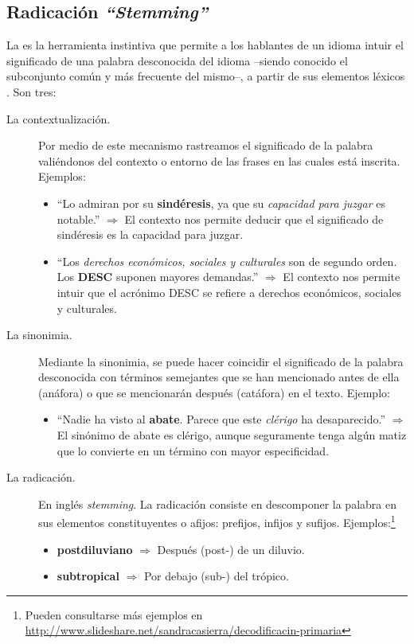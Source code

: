 \subsection{Radicación \emph{``Stemming''}}

La  es la herramienta instintiva que permite a los hablantes de un idioma intuir el significado de una palabra desconocida del idioma --siendo conocido el subconjunto común y más frecuente del mismo--, a partir de sus elementos léxicos \citep{Zubira2002}. Son tres:
\nopagebreak
\begin{description}
\item[La contextualización.] Por medio de este mecanismo rastreamos el significado de la palabra valiéndonos del contexto o entorno de las frases en las cuales está inscrita. Ejemplos:
\nopagebreak
\begin{itemize}
\item ``Lo admiran por su \textbf{sindéresis}, ya que su \emph{capacidad para juzgar} es notable.'' $\Longrightarrow$ El contexto nos permite deducir que el significado de sindéresis es la capacidad para juzgar.
\item ``Los \emph{derechos económicos, sociales y culturales} son de segundo orden. Los \textbf{DESC} suponen mayores demandas.'' $\Longrightarrow$ El contexto nos permite intuir que el acrónimo DESC se refiere a derechos económicos, sociales y culturales.
\end{itemize}
%
\item[La sinonimia.] Mediante la sinonimia, se puede hacer coincidir el significado de la palabra desconocida con términos semejantes que se han mencionado antes de ella (anáfora) o que se mencionarán después (catáfora) en el texto. Ejemplo:
\nopagebreak
\begin{itemize}
\item ``Nadie ha visto al \textbf{abate}. Parece que este \emph{clérigo} ha desaparecido.'' $\Longrightarrow$ El sinónimo de abate es clérigo, aunque seguramente tenga algún matiz que lo convierte en un término con mayor especificidad.
\end{itemize}
%
\item[La radicación.] En inglés \emph{stemming}. La radicación consiste en descomponer la palabra en sus elementos constituyentes o afijos: prefijos, infijos y sufijos. Ejemplos:\footnote{Pueden consultarse más ejemplos en \url{http://www.slideshare.net/sandracasierra/decodificacin-primaria}}
\nopagebreak
\begin{itemize}
\item \textbf{postdiluviano} $\Longrightarrow$ Después (post-) de un diluvio.
\item \textbf{subtropical}  $\Longrightarrow$ Por debajo (sub-) del trópico.
\end{itemize}
\end{description}

